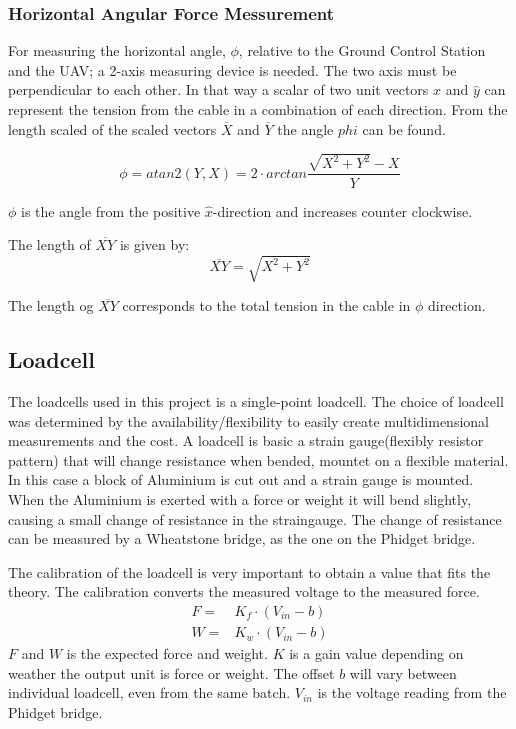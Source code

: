    

\subsubsection{Horizontal Angular Force Messurement}

For measuring the horizontal angle, $\phi$, relative to the Ground Control Station and the UAV; a 2-axis measuring device is needed. The two axis must be perpendicular to each other. In that way a scalar of two unit vectors $\hat{x}$ and $\hat{y}$ can represent the tension from the cable in a combination of each direction. 
From the length scaled of the scaled vectors $\overline{X}$ and $\overline{Y}$ the angle $phi$ can be found.

\begin{equation}
\phi = atan2 (Y,  X) = 2 \cdot arctan \frac{\sqrt{X^2+Y^2}-X}{Y}
\end{equation}

\noindent
$\phi$ is the angle from the positive $\hat{x}$-direction and increases counter clockwise. 

\noindent
The length of $\overline{XY}$ is given by:
\begin{equation}
\overline{XY} = \sqrt{X^2+Y^2}
\end{equation}

\noindent
The length og $\overline{XY}$ corresponds to the total tension in the cable in $\phi$ direction. 

\subsection{Loadcell}
The loadcells used in this project is a single-point loadcell. The choice of loadcell was determined by the availability/flexibility to easily create multidimensional measurements and the cost. A loadcell is basic a strain gauge(flexibly resistor pattern) that will change resistance when bended, mountet on a flexible material. In this case a block of Aluminium is cut out and a strain gauge is mounted. When the Aluminium is exerted with a force or weight it will bend slightly, causing a small change of resistance in the straingauge. The change of resistance can be measured by a Wheatstone bridge, as the one on the Phidget bridge. 

The calibration of the loadcell is very important to obtain a value that fits the theory. The calibration converts the measured voltage to the measured force.
\begin{eqnarray}
F =& K_f \cdot (V_{in} - b)\\
W =& K_w \cdot (V_{in} - b)
\end{eqnarray}
$F$ and $W$ is the expected force and weight. $K$ is a gain value depending on weather the output unit is force or weight. The offset $b$ will vary between individual loadcell, even from the same batch. $V_{in}$ is the voltage reading from the Phidget bridge.

